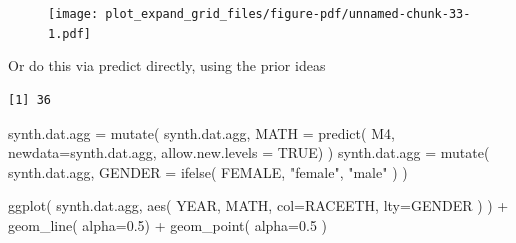 \documentclass[
  letterpaper,
  DIV=11,
  numbers=noendperiod]{scrreprt}
\newenvironment{Shaded}{\begin{snugshade}}{\end{snugshade}}
\newcommand{\AttributeTok}[1]{\textcolor[rgb]{0.49,0.56,0.16}{#1}}
\newcommand{\ConstantTok}[1]{\textcolor[rgb]{0.53,0.00,0.00}{#1}}
\newcommand{\DecValTok}[1]{\textcolor[rgb]{0.25,0.63,0.44}{#1}}
\newcommand{\FloatTok}[1]{\textcolor[rgb]{0.25,0.63,0.44}{#1}}
\newcommand{\FunctionTok}[1]{\textcolor[rgb]{0.02,0.16,0.49}{#1}}
\newcommand{\NormalTok}[1]{\textcolor[rgb]{0.00,0.44,0.13}{#1}}
\newcommand{\OtherTok}[1]{\textcolor[rgb]{0.00,0.44,0.13}{#1}}
\newcommand{\SpecialCharTok}[1]{\textcolor[rgb]{0.25,0.44,0.63}{#1}}
\newcommand{\StringTok}[1]{\textcolor[rgb]{0.25,0.44,0.63}{#1}}
\begin{document}
\begin{figure}[H]

{\centering \texttt{[image: plot\_expand\_grid\_files/figure-pdf/unnamed-chunk-33-1.pdf]}

}

\end{figure}

Or do this via predict directly, using the prior ideas

\begin{Shaded}
\end{Shaded}

\begin{verbatim}
[1] 36
\end{verbatim}

\begin{Shaded}
\begin{Highlighting}[]
\NormalTok{synth.dat.agg }\OtherTok{=} \FunctionTok{mutate}\NormalTok{( synth.dat.agg, }
                        \AttributeTok{MATH =} \FunctionTok{predict}\NormalTok{( M4, }
                                        \AttributeTok{newdata=}\NormalTok{synth.dat.agg,}
                                        \AttributeTok{allow.new.levels =} \ConstantTok{TRUE}\NormalTok{) )}
\NormalTok{synth.dat.agg }\OtherTok{=} \FunctionTok{mutate}\NormalTok{( synth.dat.agg, }\AttributeTok{GENDER =} \FunctionTok{ifelse}\NormalTok{( FEMALE, }\StringTok{"female"}\NormalTok{, }\StringTok{"male"}\NormalTok{ ) )}

\FunctionTok{ggplot}\NormalTok{( synth.dat.agg, }\FunctionTok{aes}\NormalTok{( YEAR, MATH, }\AttributeTok{col=}\NormalTok{RACEETH, }\AttributeTok{lty=}\NormalTok{GENDER ) ) }\SpecialCharTok{+}
  \FunctionTok{geom\_line}\NormalTok{( }\AttributeTok{alpha=}\FloatTok{0.5}\NormalTok{) }\SpecialCharTok{+} \FunctionTok{geom\_point}\NormalTok{( }\AttributeTok{alpha=}\FloatTok{0.5}\NormalTok{ )}
\end{Highlighting}
\end{Shaded}
\end{document}

